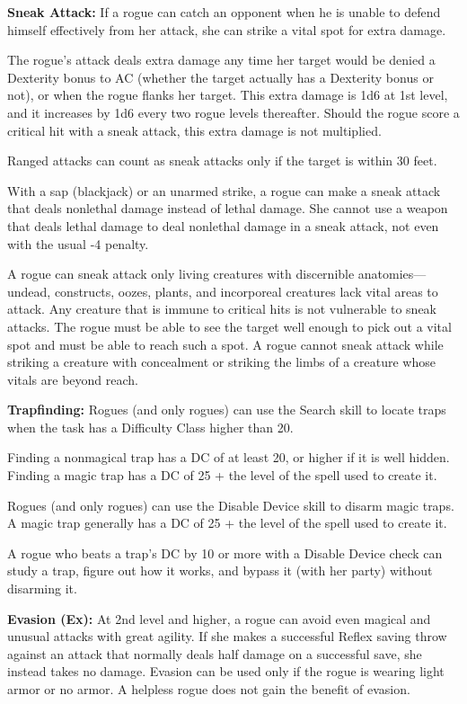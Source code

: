 \documentclass{article}
\begin{document}
\textbf{Sneak Attack:} If a rogue can catch an opponent when he is unable to defend 
himself effectively from her attack, she can strike a vital spot for extra damage.

The rogue's attack deals extra damage any time her target would be denied a Dexterity 
bonus to AC (whether the target actually has a Dexterity bonus or not), or when 
the rogue flanks her target. This extra damage is 1d6 at 1st level, and it increases 
by 1d6 every two rogue levels thereafter. Should the rogue score a critical hit 
with a sneak attack, this extra damage is not multiplied.

Ranged attacks can count as sneak attacks only if the target is within 30 feet.

With a sap (blackjack) or an unarmed strike, a rogue can make a sneak attack that 
deals nonlethal damage instead of lethal damage. She cannot use a weapon that deals 
lethal damage to deal nonlethal damage in a sneak attack, not even with the usual 
-4 penalty.

A rogue can sneak attack only living creatures with discernible anatomies---undead, 
constructs, oozes, plants, and incorporeal creatures lack vital areas to attack. 
Any creature that is immune to critical hits is not vulnerable to sneak attacks. 
The rogue must be able to see the target well enough to pick out a vital spot and 
must be able to reach such a spot. A rogue cannot sneak attack while striking a 
creature with concealment or striking the limbs of a creature whose vitals are 
beyond reach.

\textbf{Trapfinding:} Rogues (and only rogues) can use the Search skill to locate 
traps when the task has a Difficulty Class higher than 20. 

Finding a nonmagical trap has a DC of at least 20, or higher if it is well hidden. 
Finding a magic trap has a DC of 25 + the level of the spell used to create it.

Rogues (and only rogues) can use the Disable Device skill to disarm magic traps. 
A magic trap generally has a DC of 25 + the level of the spell used to create it.

A rogue who beats a trap's DC by 10 or more with a Disable Device check can study 
a trap, figure out how it works, and bypass it (with her party) without disarming 
it.

\textbf{Evasion (Ex): }At 2nd level and higher, a rogue can avoid even magical 
and unusual attacks with great agility. If she makes a successful Reflex saving 
throw against an attack that normally deals half damage on a successful save, she 
instead takes no damage. Evasion can be used only if the rogue is wearing light 
armor or no armor. A helpless rogue does not gain the benefit of evasion.
\end{document}
